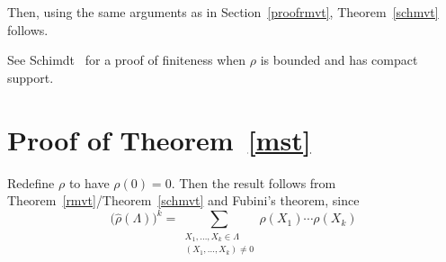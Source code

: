 \documentclass[11pt]{article}
\theoremstyle{definition}
\theoremstyle{proof}
\begin{document}
Then, using the same arguments as in Section~\ref{proofrmvt}, Theorem~\ref{schmvt} follows.

See Schimdt~\cite{schmidt58} for a proof of finiteness when $\rho$ is bounded and has compact support.

\section{Proof of Theorem~\ref{mst}}
Redefine $\rho$ to have $\rho (0) = 0$.
Then the result follows from Theorem~\ref{rmvt}/Theorem~\ref{schmvt} and Fubini's theorem, since
\[
    {\big(\widehat{\rho }(\Lambda )\big)}^{k} = \sum\limits_{\substack{X_1, \ldots, X_k \in {\Lambda } \\ (X_1, \ldots, X_k) \neq 0}} \rho (X_1) \cdots \rho (X_k)
\]





\end{document}
